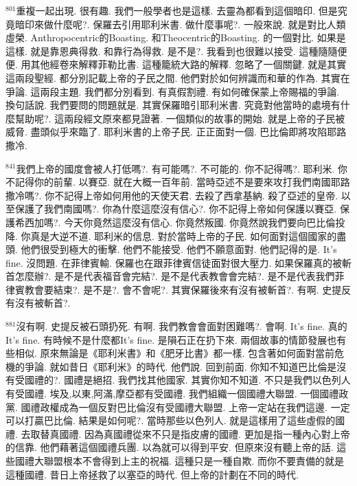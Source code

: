 \documentclass{book}
\begin{document}
$^{801}$重複一起出現.
很有趣.
我們一般學者也是這樣.
去靈為都看到這個暗印.
但是究竟暗印來做什麼呢?.
保羅去引用耶利米書.
做什麼事呢?.
一般來說.
就是對比人類虛榮.
Anthropocentric的Boasting.
和Theocentric的Boasting.
的一個對比.
如果是這樣.
就是靠恩典得救.
和靠行為得救.
是不是?.
我看到也很難以接受.
這種隨隨便便.
用其他經卷來解釋菲勒比書.
這種籠統大路的解釋.
忽略了一個關鍵.
就是其實這兩段聖經.
都分別記載上帝的子民之間.
他們對於如何辨識而和華的作為.
其實在爭論.
這兩段主題.
我們都分別看到.
有真假割禮.
有如何確保蒙上帝賜福的爭論.
換句話說.
我們要問的問題就是.
其實保羅暗引耶利米書.
究竟對他當時的處境有什麼幫助呢?.
這兩段經文原來都見證著.
一個類似的故事的開始.
就是上帝的子民被威脅.
盡頭似乎來臨了.
耶利米書的上帝子民.
正正面對一個.
巴比倫即將攻陷耶路撒冷.

$^{841}$我們上帝的國度會被人打低嗎?.
有可能嗎?.
不可能的.
你不記得嗎?.
耶利米.
你不記得你的前輩.
以賽亞.
就在大概一百年前.
當時亞述不是要來攻打我們南國耶路撒冷嗎?.
你不記得上帝如何用他的天使天君.
去殺了西拿基納.
殺了亞述的皇帝.
以至保護了我們南國嗎?.
你為什麼這麼沒有信心?.
你不記得上帝如何保護以賽亞.
保護希西加嗎?.
今天你竟然這麼沒有信心.
你竟然叛國.
你竟然說我們要向巴比倫投降.
你真是大逆不道.
耶利米的信息.
對於當時上帝的子民.
如何面對這個國家的盡頭.
他們很受到極大的衝擊.
他們不能接受.
他們不願意面對.
他們記得的是.
It's fine.
沒問題.
在菲律賓輸.
保羅也在跟菲律賓信徒面對很大壓力.
如果保羅真的被斬首怎麼辦?.
是不是代表福音會完結?.
是不是代表教會會完結?.
是不是代表我們菲律賓教會要結束?.
是不是?.
會不會呢?.
其實保羅後來有沒有被斬首?.
有啊.
史提反有沒有被斬首?.

$^{881}$沒有啊.
史提反被石頭扔死.
有啊.
我們教會會面對困難嗎?.
會啊.
It's fine.
真的It's fine.
有時候不是什麼都It's fine.
是隕石正在扔下來.
兩個故事的情節發展也有些相似.
原來無論是《耶利米書》和《肥牙比書》都一樣.
包含著如何面對當前危機的爭論.
就如昔日《耶利米》的時代.
他們說.
回到前面.
你知不知道巴比倫是沒有受國禮的?.
國禮是絕招.
我們找其他國家.
其實你知不知道.
不只是我們以色列人有受國禮.
埃及,以東,阿滿,摩亞都有受國禮.
我們組織一個國禮大聯盟.
一個國禮政黨.
國禮政權成為一個反對巴比倫沒有受國禮大聯盟.
上帝一定站在我們這邊.
一定可以打贏巴比倫.
結果是如何呢?.
當時那些以色列人.
就是這樣用了這些虛假的國禮.
去取替真國禮.
因為真國禮從來不只是指皮膚的國禮.
更加是指一種內心對上帝的信靠.
他們藉著這個國禮兵團.
以為就可以得到平安.
但原來沒有聽上帝的話.
這些國禮大聯盟根本不會得到上主的祝福.
這種只是一種自欺.
而你不要責備的就是這種國禮.
昔日上帝拯救了以塞亞的時代.
但上帝的計劃在不同的時代.
\end{document}
